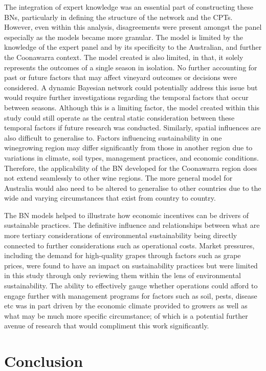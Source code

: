The integration of expert knowledge was an essential part of constructing these BNs, particularly in defining the structure of the network and the CPTs. However, even within this analysis, disagreements were present amongst the panel especially as the models became more granular. The model is limited by the knowledge of the expert panel and by its specificity to the Australian, and further the Coonawarra context. The model created is also limited, in that, it solely represents the outcomes of a single season in isolation. No further accounting for past or future factors that may affect vineyard outcomes or decisions were considered. A dynamic Bayesian network could potentially address this issue but would require further investigations regarding the temporal factors that occur between seasons. Although this is a limiting factor, the model created within this study could still operate as the central static consideration between these temporal factors if future research was conducted. Similarly, spatial influences are also difficult to generalise to. Factors influencing sustainability in one winegrowing region may differ significantly from those in another region due to variations in climate, soil types, management practices, and economic conditions. Therefore, the applicability of the BN developed for the Coonawarra region does not extend seamlessly to other wine regions. The more general model for Australia would also need to be altered to generalise to other countries due to the wide and varying circumstances that exist from country to country.

The BN models helped to illustrate how economic incentives can be drivers of sustainable practices. The definitive influence and relationships between what are more tertiary considerations of environmental sustainability being directly connected to further considerations such as operational costs. Market pressures, including the demand for high-quality grapes through factors such as grape prices, were found to have an impact on sustainability practices but were limited in this study through only reviewing them within the lens of environmental sustainability. The ability to effectively gauge whether operations could afford to engage further with management programs for factors such as soil, pests, disease etc was in part driven by the economic climate provided to growers as well as what may be much more specific circumstance; of which is a potential further avenue of research that would compliment this work significantly.

\section{Conclusion}

